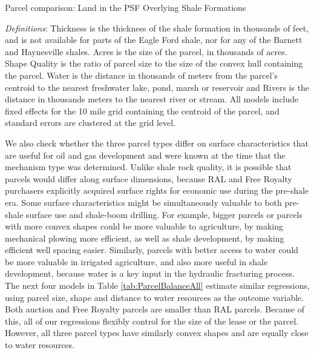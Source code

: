 \documentclass[12pt]{article}
\begin{document}
\addtolength{\tabcolsep}{6pt}
\begin{table}[htbp]
	\begin{center}
	\begin{threeparttable}
	\caption{Parcel comparison: Land in the PSF Overlying Shale Formations}
	\label{tab:ParcelBalanceAll}
	\small
	       
	\footnotesize
		\begin{tablenotes}			
			\item \textit{Definitions}: Thickness is the thickness of the shale formation in thousands of feet, and is not available for parts of the Eagle Ford shale, nor for any of the Barnett and Haynesville shales. Acres is the size of the parcel, in thousands of acres.  Shape Quality is the ratio of parcel size to the size of the convex hull containing the parcel. Water is the distance in thousands of meters from the parcel's centroid to the nearest freshwater lake, pond, marsh or reservoir and Rivers is the distance in thousands meters to the nearest river or stream. All models include fixed effects for the 10 mile grid containing the centroid of the parcel, and standard errors are clustered at the grid level.  
			\end{tablenotes}
	\end{threeparttable}
	\end{center}
\end{table}
\addtolength{\tabcolsep}{-6pt}

We also check whether the three parcel types differ on surface characteristics that are useful for oil and gas development and were known at the time that the mechanism type was determined. Unlike shale rock quality, it is possible that parcels would differ along surface dimensions, because RAL and Free Royalty purchasers explicitly acquired surface rights for economic use during the pre-shale era. Some surface characteristics might be simultaneously valuable to both pre-shale surface use and shale-boom drilling.  For example, bigger parcels or parcels with more convex shapes could be more valuable to agriculture, by making mechanical plowing more efficient, as well as shale development, by making efficient well spacing easier.  Similarly, parcels with better access to water could be more valuable in irrigated agriculture, and also more useful in shale development, because water is a key input in the hydraulic fracturing process. The next four models in Table \ref{tab:ParcelBalanceAll} estimate similar regressions, using parcel size, shape and distance to water resources as the outcome variable.  Both auction and Free Royalty parcels are smaller than RAL parcels.  Because of this, all of our regressions flexibly control for the size of the lease or the parcel.  However, all three parcel types have similarly convex shapes and are equally close to water resources.  
\end{document}
